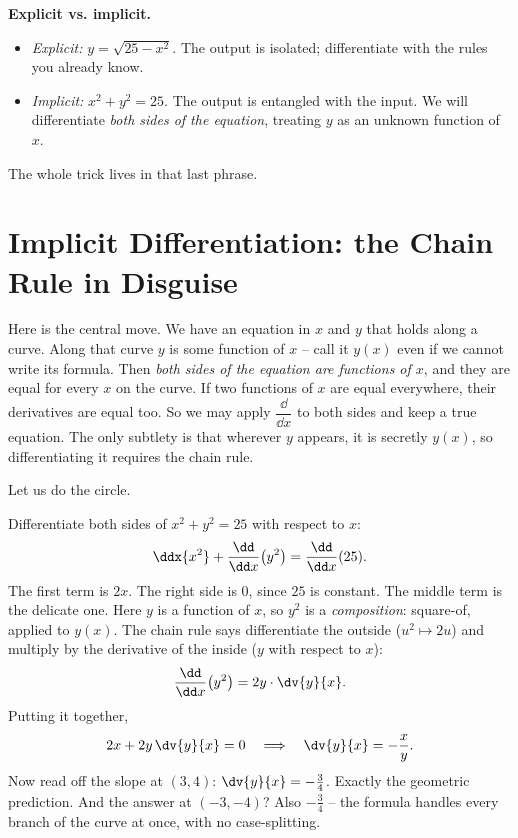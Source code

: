 \begin{focusbox}
\textbf{Explicit vs. implicit.}
\begin{itemize}
\item \emph{Explicit:} $y = \sqrt{25-x^2}$. The output is isolated; differentiate with the rules you
already know.
\item \emph{Implicit:} $x^2 + y^2 = 25$. The output is entangled with the input. We will
differentiate \emph{both sides of the equation}, treating $y$ as an unknown function of $x$.
\end{itemize}
The whole trick lives in that last phrase.
\end{focusbox}

\section{Implicit Differentiation: the Chain Rule in Disguise}
\label{ch13:implicit}

Here is the central move. We have an equation in $x$ and $y$ that holds along a curve. Along that
curve $y$ is some function of $x$ -- call it $y(x)$ even if we cannot write its formula. Then
\emph{both sides of the equation are functions of $x$}, and they are equal for every $x$ on the
curve. If two functions of $x$ are equal everywhere, their derivatives are equal too. So we may
apply $\dfrac{\dd}{\dd x}$ to both sides and keep a true equation. The only subtlety is that wherever
$y$ appears, it is secretly $y(x)$, so differentiating it requires the chain rule.

Let us do the circle.

\begin{example}
\label{ch13:ex-circle}
Differentiate both sides of $x^2 + y^2 = 25$ with respect to $x$:
\[
\ddx{x^2} + \frac{\dd}{\dd x}\!\left(y^2\right) = \frac{\dd}{\dd x}(25).
\]
The first term is $2x$. The right side is $0$, since $25$ is constant. The middle term is the
delicate one. Here $y$ is a function of $x$, so $y^2$ is a \emph{composition}: square-of, applied to
$y(x)$. The chain rule says differentiate the outside ($u^2 \mapsto 2u$) and multiply by the
derivative of the inside ($y$ with respect to $x$):
\[
\frac{\dd}{\dd x}\!\left(y^2\right) = 2y\cdot\dv{y}{x}.
\]
Putting it together,
\[
2x + 2y\,\dv{y}{x} = 0 \quad\Longrightarrow\quad \dv{y}{x} = -\frac{x}{y}.
\]
Now read off the slope at $(3,4)$: $\dv{y}{x} = -\tfrac{3}{4}$. Exactly the geometric prediction.
And the answer at $(-3,-4)$? Also $-\tfrac{3}{4}$ -- the formula handles every branch of the curve at
once, with no case-splitting.
\end{example}

